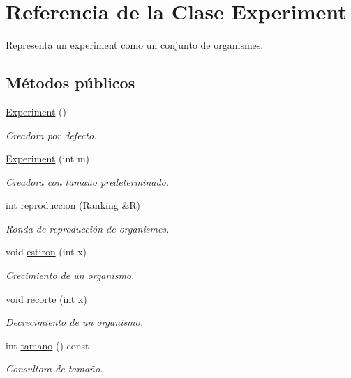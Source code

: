 \hypertarget{class_experiment}{\section{Referencia de la Clase Experiment}
\label{class_experiment}
}


Representa un experiment como un conjunto de organismes.  


\subsection*{Métodos públicos}
\begin{DoxyCompactItemize}
\item 
\hyperlink{class_experiment_a303e6a05d99f403ff4793495a2fbff58}{Experiment} ()
\begin{DoxyCompactList}\small\item\em Creadora por defecto. \end{DoxyCompactList}\item 
\hyperlink{class_experiment_a29118152cb5d4d3197764ed9baa998b4}{Experiment} (int m)
\begin{DoxyCompactList}\small\item\em Creadora con tamaño predeterminado. \end{DoxyCompactList}\item 
int \hyperlink{class_experiment_af88536a26e7e074a30edae50e86e4550}{reproduccion} (\hyperlink{class_ranking}{Ranking} \&R)
\begin{DoxyCompactList}\small\item\em Ronda de reproducción de organismes. \end{DoxyCompactList}\item 
void \hyperlink{class_experiment_a2658473f47b7df935fb1e2b48159824d}{estiron} (int x)
\begin{DoxyCompactList}\small\item\em Crecimiento de un organismo. \end{DoxyCompactList}\item 
void \hyperlink{class_experiment_a1c3d6fabc67e6d9f2a3f72e7845f5988}{recorte} (int x)
\begin{DoxyCompactList}\small\item\em Decrecimiento de un organismo. \end{DoxyCompactList}\item 
int \hyperlink{class_experiment_a32df1020a5b5e27949bd2bce272a36d9}{tamano} () const 
\begin{DoxyCompactList}\small\item\em Consultora de tamaño. \end{DoxyCompactList}\item 

\end{DoxyCompactItemize}
